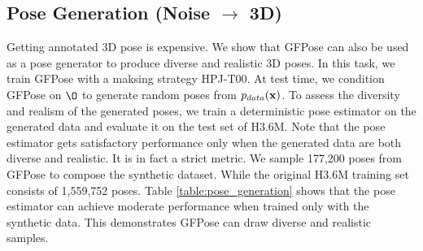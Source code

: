 \documentclass[10pt,twocolumn,letterpaper]{article}
\begin{document}
\begin{table}
    \vspace{-0.2cm}
    \caption{Denoising results on H3.6M dataset. We report MPJPE (mm) under Protocol \#2. $\mathcal{N}$ and $\mathcal{U}$ denote Gaussian and uniform noise respectively. $T$ denotes the start time of RSDE.}
    \label{table:mocap_denoise}
    \vspace{-0.5cm}
\end{table}



\subsection{Pose Generation (Noise $\rightarrow$ 3D)}
Getting annotated 3D pose is expensive. We show that GFPose can also be used as a pose generator to produce diverse and realistic 3D poses. 
In this task, we train GFPose with a maksing strategy HPJ-T00. At test time, we condition GFPose on $\O$ to generate random poses from $p_{data}(\mathbf{x})$.
To assess the diversity and realism of the generated poses, we train a deterministic pose estimator on the generated data and evaluate it on the test set of H3.6M. Note that the pose estimator gets satisfactory performance only when the generated data are both diverse and realistic. It is in fact a strict metric. We sample 177,200 poses from GFPose to compose the synthetic dataset. While the original H3.6M training set consists of 1,559,752 poses. 
Table \ref{table:pose_generation} shows that the pose estimator can achieve moderate performance when trained only with the synthetic data. This demonstrates GFPose can draw diverse and realistic samples. 
\end{document}
